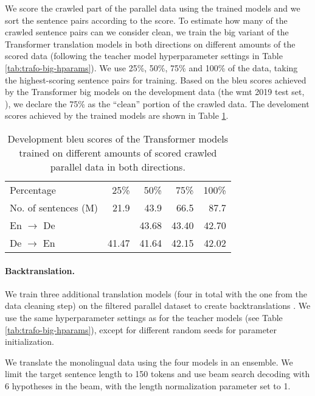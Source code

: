 We score the crawled part of the parallel data using the trained models and we
sort the sentence pairs according to the score. To estimate how many of the
crawled sentence pairs can we consider clean, we train the big variant of the
Transformer translation models in both directions on different amounts of the
scored data (following the teacher model hyperparameter settings in Table
\ref{tab:trafo-big-hparams}). We use 25\%, 50\%, 75\% and 100\% of the data,
taking the highest-scoring sentence pairs for training. Based on the \acs{bleu}
scores achieved by the Transformer big models on the development data (the
\ac{wmt} 2019 test set, \citealp{barrault-etal-2019-findings}), we declare the
75\% as the ``clean'' portion of the crawled data. The develoment scores
achieved by the trained models are shown in Table
\ref{tab:dual-cross-entropy-selection}.

\begin{table}
  \centering
  \begin{tabular}{lrrrr}
    \toprule
    Percentage & 25\% & 50\% & 75\% & 100\% \\
    No. of sentences (M) & 21.9  & 43.9 & 66.5 & 87.7 \\
    \midrule
    En $\rightarrow$ De &  & 43.68 & 43.40 & 42.70 \\
    De $\rightarrow$ En & 41.47 & 41.64 & 42.15 & 42.02 \\
    \bottomrule
  \end{tabular}
  \caption{Development \acs{bleu} scores of the Transformer models trained on
    different amounts of scored crawled parallel data in both directions.}%
  \label{tab:dual-cross-entropy-selection}
\end{table}

\paragraph{Backtranslation.} We train three additional translation models (four
in total with the one from the data cleaning step) on the filtered parallel
dataset to create backtranslations \citep{sennrich-etal-2016-improving}. We use
the same hyperparameter settings as for the teacher models (see Table
\ref{tab:trafo-big-hparams}), except for different random seeds for parameter
initialization.

We translate the monolingual data using the four models in an ensemble. We
limit the target sentence length to 150 tokens and use beam search decoding
with 6 hypotheses in the beam, with the length normalization parameter set to
1.

